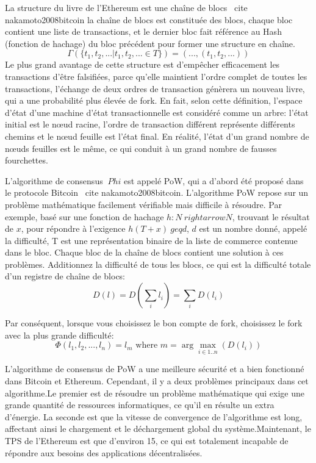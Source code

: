 \documentclass[UTF8,nofonts]{article}
\begin{document}
\begin{multicols}{2}
La structure du livre de l'Ethereum est une chaîne de blocs \ cite {nakamoto2008bitcoin} la chaîne de blocs est constituée des blocs, chaque bloc contient une liste de transactions, et le dernier bloc fait référence au Hash (fonction de hachage) du bloc précédent pour former une structure en chaîne.
\begin{equation}
\Gamma(\lbrace t_{1}, t_{2},...\vert t_{1}, t_{2},... \in T \rbrace) = (..., (t_{1}, t_{2},...)) 
\end{equation}
Le plus grand avantage de cette structure est d'empêcher efficacement les transactions d'être falsifiées, parce qu'elle maintient l'ordre complet de toutes les transactions, l'échange de deux ordres de transaction génèrera un nouveau livre,  qui a une probabilité plus élevée de fork. En fait, selon cette définition, l'espace d'état d'une machine d'état transactionnelle est considéré comme un arbre: l'état initial est le nœud racine, l'ordre de transaction différent représente différents chemins et le nœud feuille est l'état final. En réalité, l'état d'un grand nombre de nœuds feuilles est le même, ce qui conduit à un grand nombre de fausses fourchettes.

L'algorithme de consensus $ \ Phi $ est appelé PoW, qui a d'abord été proposé dans le protocole Bitcoin \ cite {nakamoto2008bitcoin}. L'algorithme PoW repose sur un problème mathématique facilement vérifiable mais difficile à résoudre. Par exemple, basé sur une fonction de hachage $ h: N \ rightarrow N $, trouvant le résultat de $ x $, pour répondre à l'exigence $ h (T + x) \ geq d $, $ d $ est un nombre donné, appelé la difficulté, T est une représentation binaire de la liste de commerce contenue dans le bloc. Chaque bloc de la chaîne de blocs contient une solution à ces problèmes. Additionnez la difficulté de tous les blocs, ce qui est la difficulté totale d'un registre de chaîne de blocs:
\begin{equation}
D(l) = D(\sum_{i} l_{i}) = \sum_{i} D(l_{i})
\end{equation}

Par conséquent, lorsque vous choisissez le bon compte de fork, choisissez le fork avec la plus grande difficulté:
\begin{equation}
 \Phi (l_{1}, l_{2}, ..., l_{n}) = l_{m} \text{ where } m = \arg\max_{i \in 1..n}(D(l_{i}))
\end{equation}

L'algorithme de consensus de PoW a une meilleure sécurité et a bien fonctionné dans Bitcoin et Ethereum. Cependant, il y a deux problèmes principaux dans cet algorithme.Le premier est de résoudre un problème mathématique qui exige une grande quantité de ressources informatiques, ce qu'il en résulte un extra d'énergie.
La seconde est que la vitesse de convergence de l'algorithme est long, affectant ainsi le chargement et le déchargement global du système.Maintenant, le TPS de l'Ethereum est que d'environ 15, ce qui est totalement incapable de répondre aux besoins des applications décentralisées.



\end{multicols}
\end{document}

